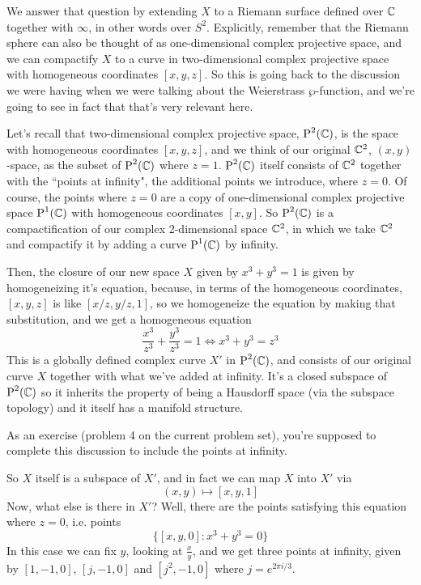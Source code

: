 \documentclass{article}
\begin{document}
\begin{enumerate}
  We answer that question by extending \(X\) to a Riemann surface defined over \(\mathbb{C}\) together with \(\infty\), in other words over \(S^2\). Explicitly, remember that the Riemann sphere can also be thought of as one-dimensional complex projective space, and we can compactify \(X\) to a curve in two-dimensional complex projective space with homogeneous coordinates \([x, y, z]\). So this is going back to the discussion we were having when we were talking about the Weierstrass \(\wp\)-function, and we're going to see in fact that that's very relevant here.

  Let's recall that two-dimensional complex projective space, \(\operatorname{P}^{2}({\mathbb{C}})\), is the space with homogeneous coordinates \([x, y, z]\), and we think of our original \(\mathbb{C}^2\), \((x, y)\)-space, as the subset of \(\operatorname{P}^{2}({\mathbb{C}})\) where \(z = 1\). \(\operatorname{P}^{2}({\mathbb{C}})\) itself consists of \(\mathbb{C}^2\) together with the ``points at infinity", the additional points we introduce, where \(z = 0\). Of course, the points where \(z = 0\) are a copy of one-dimensional complex projective space \(\operatorname{P}^{1}({\mathbb{C}})\) with homogeneous coordinates \([x, y]\). So \(\operatorname{P}^{2}({\mathbb{C}})\) is a compactification of our complex 2-dimensional space \(\mathbb{C}^2\),
  in which we take \(\mathbb{C}^2\) and compactify it by adding a curve \(\operatorname{P}^{1}({\mathbb{C}})\) by infinity.

  Then, the closure of our new space \(X\) given by \(x^3 + y^3 = 1\) is given by homogeneizing it's equation, because, in terms of the homogeneous coordinates, \([x, y, z]\) is like \([x/z, y/z, 1]\), so we homogeneize the equation by making that substitution, and we get a homogeneous equation
  \begin{equation}
    \frac{x^3}{z^3} + \frac{y^3}{z^3} = 1 \iff x^3 + y^3 = z^3
  \end{equation}
  This is a globally defined complex curve \(X'\) in \(\operatorname{P}^{2}({\mathbb{C}})\), and consists of our original curve \(X\) together with what we've added at infinity. It's a closed subspace of \(\operatorname{P}^{2}({\mathbb{C}})\) so it inherits the property of being a Hausdorff space (via the subspace topology) and it itself has a manifold structure.

  As an exercise (problem 4 on the current problem set), you're supposed to complete this discussion to include the points at infinity.

  So \(X\) itself is a subspace of \(X'\), and in fact we can map \(X\) into \(X'\) via
  \begin{equation}
    (x, y) \mapsto [x, y, 1]
  \end{equation}
  Now, what else is there in \(X'\)? Well, there are the points satisfying this equation where \(z = 0\), i.e. points
  \begin{equation}
    \{[x, y, 0] : x^3 + y^3 = 0\}
  \end{equation}
  In this case we can fix \(y\), looking at \(\frac{x}{y}\), and we get three points at infinity, given by \([1, -1, 0]\), \([j, -1, 0]\) and \([j^2, -1, 0]\) where \(j = e^{2\pi i/3}\).


\end{enumerate}
\end{document}
